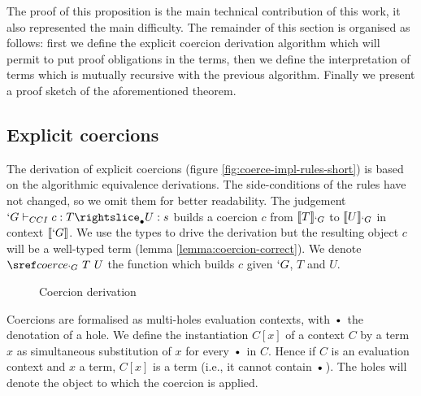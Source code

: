\documentclass{llncs}
\def\figureshrink{0em}
\begin{document}
The proof of this proposition is the main technical contribution of this
work, it also represented the main difficulty. 
The remainder of this section is organised as follows: first we 
define the explicit coercion derivation algorithm which will permit to
put proof obligations in the terms, then we define the
interpretation of terms which is mutually recursive with the previous
algorithm. Finally we present a proof sketch of the aforementioned
theorem.

\subsection{Explicit coercions}
The derivation of explicit coercions (figure
\vref{fig:coerce-impl-rules-short}) is based on the
algorithmic equivalence derivations.  
The side-conditions of the rules have not changed, so we omit them for
better readability. The judgement $\subimpl{`G}{c}{T}{U}{s}$ builds a
coercion $c$ from $\llbracket T \rrbracket_{`G}$ to $\llbracket U \rrbracket_{`G}$ in context $\llbracket `G \rrbracket$.
We use the \lng{} types to drive the
derivation but the resulting object $c$ will be a well-typed \Coq{} term
(lemma \ref{lemma:coercion-correct}). We denote $\coerce{`G}{T}{U}$
the function which builds $c$ given $`G$, $T$ and $U$.

\begin{figure}[ht]
  \subtisc
  \caption{Coercion derivation}
  \label{fig:coerce-impl-rules-short}
\end{figure}

Coercions are formalised as multi-holes evaluation contexts, with
$\ctxdot$ the denotation of a hole. We define the instantiation $C[x]$ of a context $C$
by a term $x$ as simultaneous substitution of $x$ for every $\ctxdot$ in $C$.
Hence if $C$ is an evaluation context and $x$ a term, $C[x]$ is a term
(i.e., it cannot contain $\ctxdot$).
The holes will denote the object to which the coercion is applied.
\end{document}
